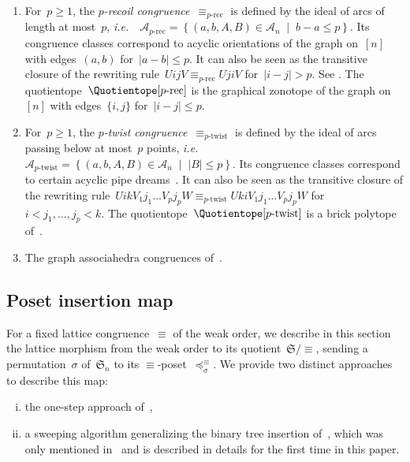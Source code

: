 \documentclass{amsart}
\theoremstyle{definition}
\newcommand{\f}[1]{{\mathfrak{#1}}} %
\newcommand{\set}[2]{\left\{ #1 \;\middle|\; #2 \right\}} %
\newcommand{\ie}{\textit{i.e.}~} %
\newcommand{\darkblue}{\color{darkblue}} %
\newcommand{\defn}[1]{\textsl{\darkblue #1}} %
\newcommand{\vincent}[1]{\todo[color=blue!30]{#1 \\ \hfill --- V.}}
\newcommand{\arcs}{{\mathcal{A}}} %
\begin{document}
\begin{enumerate}
\item 
For~$p \ge 1$, the \defn{$p$-recoil congruence}~$\equiv_{p\textrm{-rec}}$ is defined by the ideal of arcs of length at most~$p$, \ie~$\arcs_{p\textrm{-rec}} = \set{(a, b, A, B) \in \arcs_n}{b-a \le p}$.
Its congruence classes correspond to acyclic orientations of the graph on~$[n]$ with edges~$(a,b)$ for~$|a-b| \le p$.
It can also be seen as the transitive closure of the rewriting rule~$U i j V \equiv_{p\textrm{-rec}} U j i V$ for~$|i - j| > p$. See \cite{Reading-HopfAlgebras, Pilaud-brickAlgebra}.
The quotientope~$\Quotientope[p\textrm{-rec}]$ is the graphical zonotope of the graph on~$[n]$ with edges~$\{i,j\}$ for~$|i-j| \le p$.

\item
For~$p \ge 1$, the \defn{$p$-twist congruence}~$\equiv_{p\textrm{-twist}}$ is defined by the ideal of arcs passing below at most~$p$ points, \ie~$\arcs_{p\textrm{-twist}} = \set{(a, b, A, B) \in \arcs_n}{|B| \le p}$.
Its congruence classes correspond to certain acyclic pipe dreams~\cite{Pilaud-brickAlgebra}.
It can also be seen as the transitive closure of the rewriting rule~$U i k V_1 j_1 \dots V_p j_p W \equiv_{p\textrm{-twist}} U k i V_1 j_1 \dots V_p j_p W$ for~$i < j_1, \dots, j_p < k$.
The quotientope~$\Quotientope[p\textrm{-twist}]$ is a brick polytope of~\cite{PilaudSantos-brickPolytope,PilaudStump-brickPolytope}.

\item
The graph associahedra congruences of~\cite{BarnardMcConville}.
\vincent{todo}
\end{enumerate}


\subsection{Poset insertion map}
\label{subsec:insertionMap}

For a fixed lattice congruence~$\equiv$ of the weak order, we describe in this section the lattice morphism from the weak order to its quotient~$\f{S}/{\equiv}$, sending a permutation~$\sigma$ of~$\f{S}_n$ to its $\equiv$-poset~$\preccurlyeq_\sigma^\equiv$.
We provide two distinct approaches to describe this map:
\begin{enumerate}[(i)]
\item the one-step approach of~\cite[Sect.~2.4]{Pilaud-arcDiagramAlgebra},
\item a sweeping algorithm generalizing the binary tree insertion of~\cite{HivertNovelliThibon-algebraBinarySearchTrees}, which was only mentioned in~\cite[Sect.~2.4]{Pilaud-arcDiagramAlgebra} and is described in details for the first time in this paper.
\end{enumerate}
\end{document}
